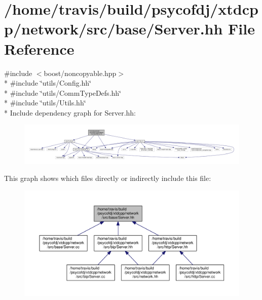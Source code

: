 \hypertarget{base_2Server_8hh}{\section{/home/travis/build/psycofdj/xtdcpp/network/src/base/\-Server.hh File Reference}
\label{base_2Server_8hh}
}
{\ttfamily \#include $<$boost/noncopyable.\-hpp$>$}\\*
{\ttfamily \#include \char`\"{}utils/\-Config.\-hh\char`\"{}}\\*
{\ttfamily \#include \char`\"{}utils/\-Comm\-Type\-Defs.\-hh\char`\"{}}\\*
{\ttfamily \#include \char`\"{}utils/\-Utils.\-hh\char`\"{}}\\*
Include dependency graph for Server.\-hh\-:
\nopagebreak
\begin{figure}[H]
\begin{center}
\leavevmode
\includegraphics[width=350pt]{base_2Server_8hh__incl}
\end{center}
\end{figure}
This graph shows which files directly or indirectly include this file\-:
\nopagebreak
\begin{figure}[H]
\begin{center}
\leavevmode
\includegraphics[width=350pt]{base_2Server_8hh__dep__incl}
\end{center}
\end{figure}
